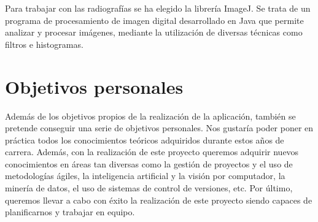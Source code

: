 Para trabajar con las radiografías se ha elegido la librería ImageJ. Se trata de un programa de procesamiento de imagen digital desarrollado en Java que permite analizar y procesar imágenes, mediante la utilización de diversas técnicas como filtros e histogramas.

\section{Objetivos personales}
Además de los objetivos propios de la realización de la aplicación, también se pretende conseguir una serie de objetivos personales.
Nos gustaría poder poner en práctica todos los conocimientos teóricos adquiridos durante estos años de carrera. Además, con la realización de este proyecto queremos adquirir nuevos conocimientos en áreas tan diversas como la gestión de proyectos y el uso de metodologías ágiles, la inteligencia artificial y la visión por computador, la minería de datos, el uso de sistemas de control de versiones, etc.
Por último, queremos llevar a cabo con éxito la realización de este proyecto siendo capaces de planificarnos y trabajar en equipo.

